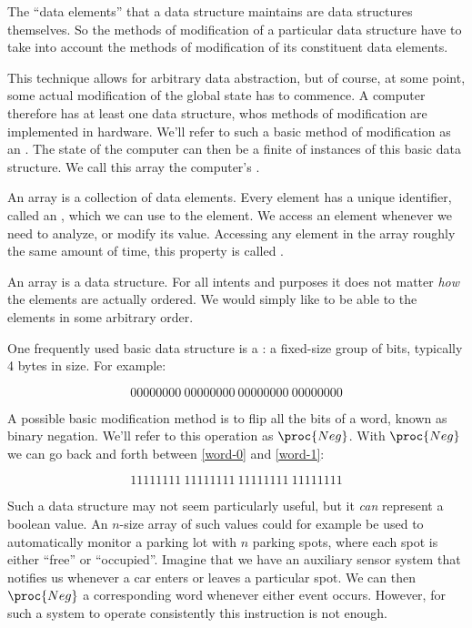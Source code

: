 The ``data elements'' that a data structure maintains are data structures
themselves. So the methods of modification of a particular data structure have
to take into account the methods of modification of its constituent data
elements.

This technique allows for arbitrary data abstraction, but of course, at some
point, some actual modification of the global state has to commence. A computer
therefore has  at least one  data structure, whos methods of
modification are implemented in hardware. We'll refer to such a basic method of
modification as an . The state of the computer can then be a
finite  of instances of this basic data structure. We call this
array the computer's .

\begin{definition}

An array is a collection of data elements. Every element has a unique
identifier, called an , which we can use to  the
element. We access an element whenever we need to analyze, or modify its value.
Accessing any element in the array roughly the same amount of time, this
property is called .

\end{definition}

An array is a data structure. For all intents and purposes it does not matter
\emph{how} the elements are actually ordered. We would simply like to be able
to  the elements in some arbitrary order.

One frequently used basic data structure is a : a fixed-size group of
bits, typically 4 bytes in size. For example:

\begin{equation}
0000 0000\ 0000 0000\ 0000 0000\ 0000 0000 \label{word-0}
\end{equation}

A possible basic modification method is to flip all the bits of a word, known
as binary negation. We'll refer to this operation as $\proc{Neg}$. With
$\proc{Neg}$ we can go back and forth between \ref{word-0} and \ref{word-1}:

\begin{equation}
1111 1111\ 1111 1111\ 1111 1111\ 1111 1111 \label{word-1}
\end{equation}

Such a data structure may not seem particularly useful, but it \emph{can}
represent a boolean value. An $n$-size array of such values could for example
be used to automatically monitor a parking lot with $n$ parking spots, where
each spot is either ``free'' or ``occupied''. Imagine that we have an auxiliary
sensor system that notifies us whenever a car enters or leaves a particular
spot. We can then $\proc{Neg}$ a corresponding word whenever either event
occurs. However, for such a system to operate consistently this instruction is
not enough.

